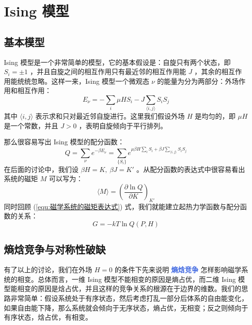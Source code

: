 \section{Ising 模型}\label{sec:Ising模型}

\subsection{基本模型}

Ising 模型是一个非常简单的模型，它的基本假设是：自旋只有两个状态，即 $S_i = \pm 1$ ，并且自旋之间的相互作用只有最近邻的相互作用能 $J$ ，其余的相互作用能统统忽略。这样一来，Ising 模型一个微观态 $\nu$ 的能量为分为两部分：外场作用和相互作用：
\begin{equation}\label{equ:Ising模型的哈密顿量}
    E_\nu = - \sum_i \mu H S_i-J \sum_{\langle i,j \rangle} S_i S_j
\end{equation}
其中 $\langle i,j \rangle$ 表示求和只对最近邻自旋进行。这里我们假设外场 $H$ 是均匀的，即 $\mu H$ 是一个常数，并且 $J>0$ ，表明自旋倾向于平行排列。

那么很容易写出 Ising 模型的配分函数：
\begin{equation}\label{equ:Ising模型的配分函数}
    Q = \sum_\nu e^{-\beta E_\nu} = \sum_{\{S_i\}} e^{\mu \beta H \sum_i  S_i + \beta J \sum_{\langle i,j \rangle} S_i S_j}
\end{equation}
在后面的讨论中，我们设 $\beta H = K, ~\beta J = K'$ 。从配分函数的表达式中很容易看出系统的磁矩 $M$ 可以写为：
\begin{equation}\label{equ:Ising模型的磁矩表达式}
    \langle M \rangle = \left(\frac{\partial \ln Q}{\partial K}\right)_{K'}
\end{equation}
同时回顾 (\ref*{equ:磁学系统的磁矩表达式}) 式，我们就能建立起热力学函数与配分函数的关系：
\begin{equation}\label{equ:热力学函数与配分函数}
    G = -kT\ln Q(P,H)
\end{equation}


\subsection{熵焓竞争与对称性破缺}

有了以上的讨论，我们在外场 $H  =0$ 的条件下先来说明 \textcolor{RoyalBlue}{\textbf{\kaishu 熵焓竞争}} 怎样影响磁学系统的相变。总体而言，一维 Ising 模型不能相变的原因是熵占优，而二维 Ising 模型能相变的原因是焓占优，并且这样的竞争关系的根源在于边界的维数。我们的思路非常简单：假设系统处于有序状态，然后考虑打乱一部分后体系的自由能变化，如果自由能下降，那么系统就会倾向于无序状态，熵占优，无相变；反之则倾向于有序状态，焓占优，有相变。

